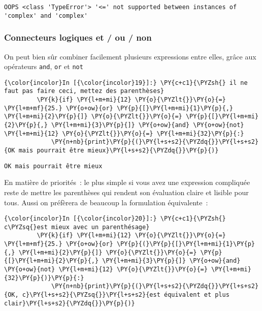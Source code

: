     \begin{Verbatim}[commandchars=\\\{\}]
OOPS <class 'TypeError'> '<=' not supported between instances of 'complex' and 'complex'

    \end{Verbatim}

    \hypertarget{connecteurs-logiques-et-ou-non}{%
\subsubsection{Connecteurs logiques et / ou /
non}\label{connecteurs-logiques-et-ou-non}}

    On peut bien sûr combiner facilement plusieurs expressions entre elles,
grâce aux opérateurs \texttt{and}, \texttt{or} et \texttt{not}

    \begin{Verbatim}[commandchars=\\\{\}]
{\color{incolor}In [{\color{incolor}19}]:} \PY{c+c1}{\PYZsh{} il ne faut pas faire ceci, mettez des parenthèses}
         \PY{k}{if} \PY{l+m+mi}{12} \PY{o}{\PYZlt{}}\PY{o}{=} \PY{l+m+mf}{25.} \PY{o+ow}{or} \PY{p}{[}\PY{l+m+mi}{1}\PY{p}{,} \PY{l+m+mi}{2}\PY{p}{]} \PY{o}{\PYZlt{}}\PY{o}{=} \PY{p}{[}\PY{l+m+mi}{2}\PY{p}{,} \PY{l+m+mi}{3}\PY{p}{]} \PY{o+ow}{and} \PY{o+ow}{not} \PY{l+m+mi}{12} \PY{o}{\PYZlt{}}\PY{o}{=} \PY{l+m+mi}{32}\PY{p}{:}
             \PY{n+nb}{print}\PY{p}{(}\PY{l+s+s2}{\PYZdq{}}\PY{l+s+s2}{OK mais pourrait être mieux}\PY{l+s+s2}{\PYZdq{}}\PY{p}{)}
\end{Verbatim}


    \begin{Verbatim}[commandchars=\\\{\}]
OK mais pourrait être mieux

    \end{Verbatim}

    En matière de priorités~: le plus simple si vous avez une expression
compliquée reste de mettre les parenthèses qui rendent son évaluation
claire et lisible pour tous. Aussi on préfèrera de beaucoup la
formulation équivalente~:

    \begin{Verbatim}[commandchars=\\\{\}]
{\color{incolor}In [{\color{incolor}20}]:} \PY{c+c1}{\PYZsh{} c\PYZsq{}est mieux avec un parenthésage}
         \PY{k}{if} \PY{l+m+mi}{12} \PY{o}{\PYZlt{}}\PY{o}{=} \PY{l+m+mf}{25.} \PY{o+ow}{or} \PY{p}{(}\PY{p}{[}\PY{l+m+mi}{1}\PY{p}{,} \PY{l+m+mi}{2}\PY{p}{]} \PY{o}{\PYZlt{}}\PY{o}{=} \PY{p}{[}\PY{l+m+mi}{2}\PY{p}{,} \PY{l+m+mi}{3}\PY{p}{]} \PY{o+ow}{and} \PY{o+ow}{not} \PY{l+m+mi}{12} \PY{o}{\PYZlt{}}\PY{o}{=} \PY{l+m+mi}{32}\PY{p}{)}\PY{p}{:}
             \PY{n+nb}{print}\PY{p}{(}\PY{l+s+s2}{\PYZdq{}}\PY{l+s+s2}{OK, c}\PY{l+s+s2}{\PYZsq{}}\PY{l+s+s2}{est équivalent et plus clair}\PY{l+s+s2}{\PYZdq{}}\PY{p}{)}
\end{Verbatim}


